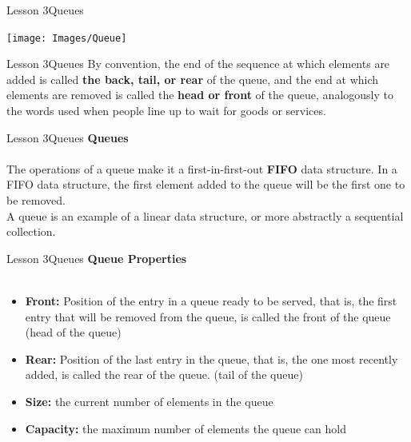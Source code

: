 \documentclass[aspectratio=1610]{beamer}
\begin{document}
\begin{frame}{Lesson 3}{Queues}
\begin{center}
\texttt{[image: Images/Queue]}
\end{center}
\end{frame}


\begin{frame}{Lesson 3}{Queues}
\LARGE
By convention, the end of the sequence at which elements are added
is called \textbf{the back, tail, or rear} of the queue, and the end
at which elements are removed is called the \textbf{head or front}
of the queue, analogously to the words used when people line up to
wait for goods or services.
\end{frame}



\begin{frame}{Lesson 3}{Queues}
\LARGE
\textbf{Queues}\\~\\
The operations of a queue make it a first-in-first-out \textbf{FIFO}
data structure. In a FIFO data structure, the first element added to
the queue will be the first one to be removed.\\
A queue is an example of a linear data structure, or more abstractly
a sequential collection.
\end{frame}


\begin{frame}{Lesson 3}{Queues}
\LARGE
\textbf{Queue Properties}\\~\\
\Large
\begin{itemize}
\item \textbf{Front:} Position of the entry in a queue ready to be served, that is, the first entry that will be removed from the queue, is called the front of the queue (head of the queue)
\item \textbf{Rear:} Position of the last entry in the queue, that is, the one most recently added, is called the rear of the queue. (tail of the queue)
\item \textbf{Size:} the current number of elements in the queue 
\item \textbf{Capacity:} the maximum number of elements the queue can hold
\end{itemize}
\end{frame}
\end{document}
